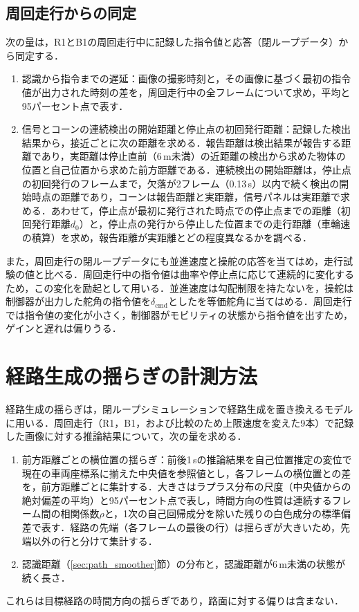 \subsection{周回走行からの同定}
\label{sec:ident_lap}
次の量は，R1とB1の周回走行中に記録した指令値と応答（閉ループデータ）から同定する．
\begin{enumerate}
  \item 認識から指令までの遅延：画像の撮影時刻と，その画像に基づく最初の指令値が出力された時刻の差を，周回走行中の全フレームについて求め，平均と95パーセント点で表す．
  \item 信号とコーンの連続検出の開始距離と停止点の初回発行距離：記録した検出結果から，接近ごとに次の距離を求める．報告距離は検出結果が報告する距離であり，実距離は停止直前（6\,m未満）の近距離の検出から求めた物体の位置と自己位置から求めた前方距離である．連続検出の開始距離は，停止点の初回発行のフレームまで，欠落が2フレーム（0.13\,s）以内で続く検出の開始時点の距離であり，コーンは報告距離と実距離，信号パネルは実距離で求める．あわせて，停止点が最初に発行された時点での停止点までの距離（初回発行距離$d_0$）と，停止点の発行から停止した位置までの走行距離（車輪速の積算）を求め，報告距離が実距離とどの程度異なるかを調べる．
\end{enumerate}
また，周回走行の閉ループデータにも並進速度と操舵の応答を当てはめ，走行試験の値と比べる．周回走行中の指令値は曲率や停止点に応じて連続的に変化するため，この変化を励起として用いる．並進速度は勾配制限を持たないを，操舵は制御器が出力した舵角の指令値を$\delta_{\mathrm{cmd}}$としたを等価舵角に当てはめる．周回走行では指令値の変化が小さく，制御器がモビリティの状態から指令値を出すため，ゲインと遅れは偏りうる．

\section{経路生成の揺らぎの計測方法}
\label{sec:path_error}
経路生成の揺らぎは，閉ループシミュレーションで経路生成を置き換えるモデルに用いる．周回走行（R1，B1，および比較のため上限速度を変えた9本）で記録した画像に対する推論結果について，次の量を求める．
\begin{enumerate}
  \item 前方距離ごとの横位置の揺らぎ：前後1\,sの推論結果を自己位置推定の変位で現在の車両座標系に揃えた中央値を参照値とし，各フレームの横位置との差を，前方距離ごとに集計する．大きさはラプラス分布の尺度（中央値からの絶対偏差の平均）と95パーセント点で表し，時間方向の性質は連続するフレーム間の相関係数$\rho$と，1次の自己回帰成分を除いた残りの白色成分の標準偏差で表す．経路の先端（各フレームの最後の行）は揺らぎが大きいため，先端以外の行と分けて集計する．
  \item 認識距離（\ref{sec:path_smoother}節）の分布と，認識距離が6\,m未満の状態が続く長さ．
\end{enumerate}
これらは目標経路の時間方向の揺らぎであり，路面に対する偏りは含まない．

